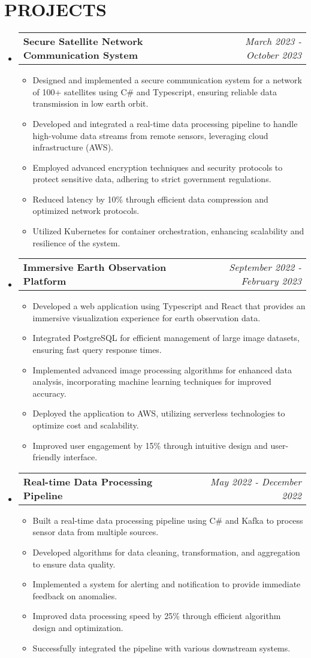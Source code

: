 \documentclass[letterpaper,11pt]{article}
\makeatletter
\newcommand{\resumeItem}[1]{\item\small{{#1 \vspace{-3pt}}}}
\newcommand{\resumeProjectHeading}[2]{\item\begin{tabular*}{0.97\textwidth}{l@{\extracolsep{\fill}}r}\small#1 & #2 \\ \end{tabular*}\vspace{-7pt}}
\newcommand{\resumeSubHeadingListStart}{\begin{itemize}[leftmargin=0.15in, label={}]}
\newcommand{\resumeSubHeadingListEnd}{\end{itemize}}
\newcommand{\resumeItemListStart}{\begin{itemize}}
\newcommand{\resumeItemListEnd}{\end{itemize}\vspace{-5pt}}
\makeatother
\begin{document}
\section{{\fontsize{9pt}{20pt}\selectfont \textbf{PROJECTS}}}\resumeSubHeadingListStart
\resumeProjectHeading{\textbf{Secure Satellite Network Communication System}}{\textit{March 2023 - October 2023}}
\resumeItemListStart
\resumeItem{Designed and implemented a secure communication system for a network of 100+ satellites using C\# and Typescript, ensuring reliable data transmission in low earth orbit.}
\resumeItem{Developed and integrated a real-time data processing pipeline to handle high-volume data streams from remote sensors, leveraging cloud infrastructure (AWS).}
\resumeItem{Employed advanced encryption techniques and security protocols to protect sensitive data, adhering to strict government regulations.}
\resumeItem{Reduced latency by 10\% through efficient data compression and optimized network protocols.}
\resumeItem{Utilized Kubernetes for container orchestration, enhancing scalability and resilience of the system.}
\resumeItemListEnd\vspace{-6pt}
\resumeProjectHeading{\textbf{Immersive Earth Observation Platform}}{\textit{September 2022 - February 2023}}
\resumeItemListStart
\resumeItem{Developed a web application using Typescript and React that provides an immersive visualization experience for earth observation data.}
\resumeItem{Integrated PostgreSQL for efficient management of large image datasets, ensuring fast query response times.}
\resumeItem{Implemented advanced image processing algorithms for enhanced data analysis, incorporating machine learning techniques for improved accuracy.}
\resumeItem{Deployed the application to AWS, utilizing serverless technologies to optimize cost and scalability.}
\resumeItem{Improved user engagement by 15\% through intuitive design and user-friendly interface.}
\resumeItemListEnd\vspace{-6pt}
\resumeProjectHeading{\textbf{Real-time Data Processing Pipeline}}{\textit{May 2022 - December 2022}}
\resumeItemListStart
\resumeItem{Built a real-time data processing pipeline using C\# and Kafka to process sensor data from multiple sources.}
\resumeItem{Developed algorithms for data cleaning, transformation, and aggregation to ensure data quality.}
\resumeItem{Implemented a system for alerting and notification to provide immediate feedback on anomalies.}
\resumeItem{Improved data processing speed by 25\% through efficient algorithm design and optimization.}
\resumeItem{Successfully integrated the pipeline with various downstream systems.}
\resumeItemListEnd
\resumeSubHeadingListEnd\vspace{-17pt}
\end{document}
